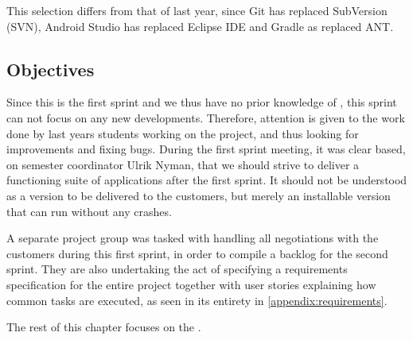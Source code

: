 This selection differs from that of last year, since Git has replaced SubVersion (SVN), Android Studio has replaced Eclipse IDE and Gradle as replaced ANT.

\subsection{Objectives}\label{sec:sprint1:objectives}
Since this is the first sprint and we thus have no prior knowledge of \giraf, this sprint can not focus on any new developments.
Therefore, attention is given to the work done by last years students working on the project, and thus looking for improvements and fixing bugs.
During the first sprint meeting, it was clear based, on semester coordinator Ulrik Nyman, that we should strive to deliver a functioning suite of applications after the first sprint.
It should not be understood as a version to be delivered to the customers, but merely an installable version that can run without any crashes. 

A separate project group was tasked with handling all negotiations with the customers during this first sprint, in order to compile a backlog for the second sprint.
They are also undertaking the act of specifying a requirements specification for the entire project together with user stories explaining how common tasks are executed, as seen in its entirety in \cref{appendix:requirements}.


The rest of this chapter focuses on the \launcher.









